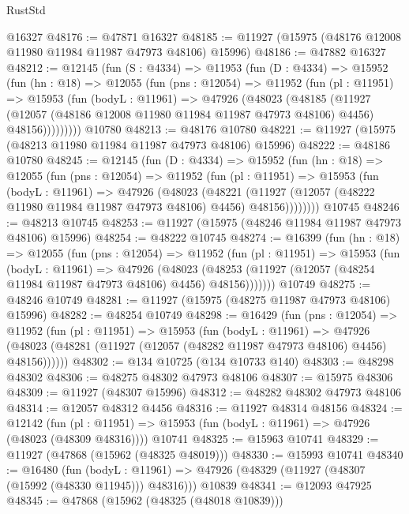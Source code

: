 \begin{lexlean}{RustStd}
\begin{coremodule}
    @16327
@48176 := @47871 @16327
@48185 := @11927 (@15975 (@48176 @12008 @11980 @11984 @11987 @47973 @48106) @15996)
@48186 := @47882 @16327
@48212 := @12145
    (fun (S : @4334) =>
    @11953
      (fun (D : @4334) =>
      @15952
        (fun (hn : @18) =>
        @12055
          (fun (pns : @12054) =>
          @11952
            (fun (pl : @11951) =>
            @15953
              (fun (bodyL : @11961) =>
              @47926
                (@48023
                  (@48185
                    (@11927
                      (@12057 (@48186 @12008 @11980 @11984 @11987 @47973 @48106) @4456)
                      @48156)))))))))
    @10780
@48213 := @48176 @10780
@48221 := @11927 (@15975 (@48213 @11980 @11984 @11987 @47973 @48106) @15996)
@48222 := @48186 @10780
@48245 := @12145
    (fun (D : @4334) =>
    @15952
      (fun (hn : @18) =>
      @12055
        (fun (pns : @12054) =>
        @11952
          (fun (pl : @11951) =>
          @15953
            (fun (bodyL : @11961) =>
            @47926
              (@48023
                (@48221
                  (@11927 (@12057 (@48222 @11980 @11984 @11987 @47973 @48106) @4456) @48156))))))))
    @10745
@48246 := @48213 @10745
@48253 := @11927 (@15975 (@48246 @11984 @11987 @47973 @48106) @15996)
@48254 := @48222 @10745
@48274 := @16399
    (fun (hn : @18) =>
    @12055
      (fun (pns : @12054) =>
      @11952
        (fun (pl : @11951) =>
        @15953
          (fun (bodyL : @11961) =>
          @47926
            (@48023
              (@48253 (@11927 (@12057 (@48254 @11984 @11987 @47973 @48106) @4456) @48156)))))))
    @10749
@48275 := @48246 @10749
@48281 := @11927 (@15975 (@48275 @11987 @47973 @48106) @15996)
@48282 := @48254 @10749
@48298 := @16429
    (fun (pns : @12054) =>
    @11952
      (fun (pl : @11951) =>
      @15953
        (fun (bodyL : @11961) =>
        @47926 (@48023 (@48281 (@11927 (@12057 (@48282 @11987 @47973 @48106) @4456) @48156))))))
@48302 := @134 @10725 (@134 @10733 @140)
@48303 := @48298 @48302
@48306 := @48275 @48302 @47973 @48106
@48307 := @15975 @48306
@48309 := @11927 (@48307 @15996)
@48312 := @48282 @48302 @47973 @48106
@48314 := @12057 @48312 @4456
@48316 := @11927 @48314 @48156
@48324 := @12142
    (fun (pl : @11951) => @15953 (fun (bodyL : @11961) => @47926 (@48023 (@48309 @48316))))
    @10741
@48325 := @15963 @10741
@48329 := @11927 (@47868 (@15962 (@48325 @48019)))
@48330 := @15993 @10741
@48340 := @16480
    (fun (bodyL : @11961) => @47926 (@48329 (@11927 (@48307 (@15992 (@48330 @11945))) @48316)))
    @10839
@48341 := @12093 @47925
@48345 := @47868 (@15962 (@48325 (@48018 @10839)))

\end{coremodule}
\end{lexlean}
